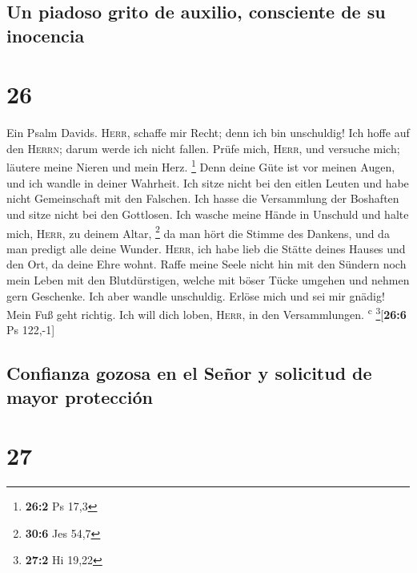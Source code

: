 \hypertarget{un-piadoso-grito-de-auxilio-consciente-de-su-inocencia}{%
\subsection{Un piadoso grito de auxilio, consciente de su
inocencia}\label{un-piadoso-grito-de-auxilio-consciente-de-su-inocencia}}

\hypertarget{section-25}{%
\section{26}\label{section-25}}

 Ein Psalm Davids. \textsc{Herr}, schaffe mir Recht; denn
ich bin unschuldig! Ich hoffe auf den \textsc{Herrn}; darum werde ich
nicht fallen.  Prüfe mich, \textsc{Herr}, und versuche
mich; läutere meine Nieren und mein Herz. \footnote{\textbf{26:2} Ps
  17,3}  Denn deine Güte ist vor meinen Augen, und ich
wandle in deiner Wahrheit.  Ich sitze nicht bei den eitlen
Leuten und habe nicht Gemeinschaft mit den Falschen.  Ich
hasse die Versammlung der Boshaften und sitze nicht bei den Gottlosen.
 Ich wasche meine Hände in Unschuld und halte mich,
\textsc{Herr}, zu deinem Altar, \footnote{\textbf{30:6} Jes 54,7}
 da man hört die Stimme des Dankens, und da man predigt
alle deine Wunder.  \textsc{Herr}, ich habe lieb die
Stätte deines Hauses und den Ort, da deine Ehre wohnt. 
Raffe meine Seele nicht hin mit den Sündern noch mein Leben mit den
Blutdürstigen,  welche mit böser Tücke umgehen und nehmen
gern Geschenke.  Ich aber wandle unschuldig. Erlöse mich
und sei mir gnädig!  Mein Fuß geht richtig. Ich will dich
loben, \textsc{Herr}, in den Versammlungen. \textsuperscript{c}
\footnote{\textbf{27:2} Hi 19,22}{[}\textbf{26:6} Ps 122,-1{]}

\hypertarget{confianza-gozosa-en-el-seuxf1or-y-solicitud-de-mayor-protecciuxf3n}{%
\subsection{Confianza gozosa en el Señor y solicitud de mayor
protección}\label{confianza-gozosa-en-el-seuxf1or-y-solicitud-de-mayor-protecciuxf3n}}

\hypertarget{section-26}{%
\section{27}\label{section-26}}


